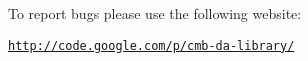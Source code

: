 To report bugs please use the following website\-:

\href{http://code.google.com/p/cmb-da-library/}{\tt http\-://code.\-google.\-com/p/cmb-\/da-\/library/} 